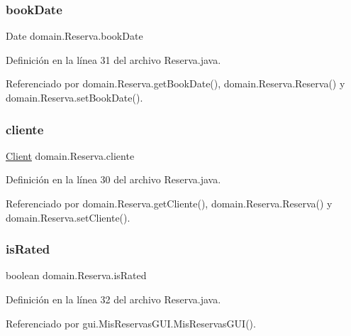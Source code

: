 \subsubsection{\texorpdfstring{bookDate}{bookDate}}
{\footnotesize\ttfamily Date domain.\+Reserva.\+book\+Date\hspace{0.3cm}{\ttfamily [private]}}



Definición en la línea 31 del archivo Reserva.\+java.



Referenciado por domain.\+Reserva.\+get\+Book\+Date(), domain.\+Reserva.\+Reserva() y domain.\+Reserva.\+set\+Book\+Date().

\mbox{\label{classdomain_1_1_reserva_a2e519e6a41cf08679b9c9f6a4540a454}} 
\subsubsection{\texorpdfstring{cliente}{cliente}}
{\footnotesize\ttfamily \mbox{\hyperlink{classdomain_1_1_client}{Client}} domain.\+Reserva.\+cliente\hspace{0.3cm}{\ttfamily [private]}}



Definición en la línea 30 del archivo Reserva.\+java.



Referenciado por domain.\+Reserva.\+get\+Cliente(), domain.\+Reserva.\+Reserva() y domain.\+Reserva.\+set\+Cliente().

\mbox{\label{classdomain_1_1_reserva_ad4ad501d339fb6accca9de2122201d04}} 
\subsubsection{\texorpdfstring{isRated}{isRated}}
{\footnotesize\ttfamily boolean domain.\+Reserva.\+is\+Rated\hspace{0.3cm}{\ttfamily [private]}}



Definición en la línea 32 del archivo Reserva.\+java.



Referenciado por gui.\+Mis\+Reservas\+G\+U\+I.\+Mis\+Reservas\+G\+U\+I().

